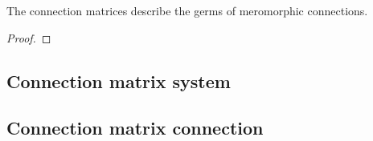 \begin{cor}
  The connection matrices describe the germs of meromorphic connections.
\end{cor}
\begin{proof}
  \TODO
\end{proof}

\subsection{Connection matrix \leftrightarrow{} system}
\subsection{Connection matrix \rightarrow{} connection}
\begin{comment}
  There is a thm in \cite{sabbah2007isomonodromic}
\end{comment}

